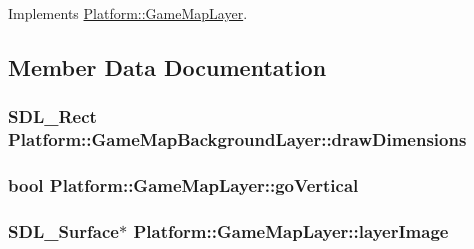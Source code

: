 Implements \hyperlink{class_platform_1_1_game_map_layer_80631a9be3fb03f96ca3565c8860f077}{Platform::GameMapLayer}.

\subsection{Member Data Documentation}
\hypertarget{class_platform_1_1_game_map_background_layer_c9d873f233fe780e9e1cf90bfd4458e2}{
\subsubsection[{drawDimensions}]{\setlength{\rightskip}{0pt plus 5cm}SDL\_\-Rect {\bf Platform::GameMapBackgroundLayer::drawDimensions}}}
\label{df/d72/class_platform_1_1_game_map_background_layer_c9d873f233fe780e9e1cf90bfd4458e2}


\hypertarget{class_platform_1_1_game_map_layer_e4f38bbcc758a8099c296f130912f8f6}{
\subsubsection[{goVertical}]{\setlength{\rightskip}{0pt plus 5cm}bool {\bf Platform::GameMapLayer::goVertical}}}
\label{d8/d53/class_platform_1_1_game_map_layer_e4f38bbcc758a8099c296f130912f8f6}


\hypertarget{class_platform_1_1_game_map_layer_b94756f95136f23ec04b70ecb6351e2e}{
\subsubsection[{layerImage}]{\setlength{\rightskip}{0pt plus 5cm}SDL\_\-Surface$\ast$ {\bf Platform::GameMapLayer::layerImage}}}
\label{d8/d53/class_platform_1_1_game_map_layer_b94756f95136f23ec04b70ecb6351e2e}


